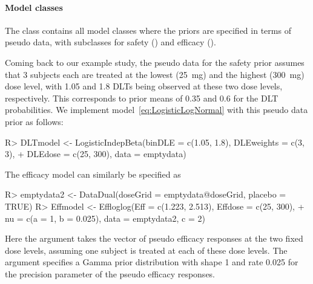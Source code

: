 \documentclass[article]{jss}\usepackage[]{graphicx}\usepackage[]{color}
\begin{document}
\paragraph{Model classes}
The  class contains all model classes where the priors are specified in terms of pseudo data, with subclasses for safety () and efficacy ().

Coming back to our example study, the pseudo data for the safety prior assumes that 3 subjects each are treated at the lowest (25~mg) and the highest (300~mg) dose level, with 1.05 and 1.8
DLTs being observed at these two dose levels, respectively. This corresponds to prior 
means of 0.35 and 0.6 for the DLT probabilities. We implement 
model~\eqref{eq:LogisticLogNormal} with this pseudo data prior as follows:
\begin{Schunk}
\begin{Sinput}
R> DLTmodel <- LogisticIndepBeta(binDLE = c(1.05, 1.8), DLEweights = c(3, 3),
+                                DLEdose = c(25, 300), data = emptydata)
\end{Sinput}
\end{Schunk}

The efficacy model can similarly be specified as
\begin{Schunk}
\begin{Sinput}
R> emptydata2 <- DataDual(doseGrid = emptydata@doseGrid, placebo = TRUE)
R> Effmodel <- Effloglog(Eff = c(1.223, 2.513), Effdose = c(25, 300), 
+                        nu = c(a = 1, b = 0.025), data = emptydata2, c = 2)
\end{Sinput}
\end{Schunk}
Here the argument  takes the vector of pseudo efficacy responses at the two fixed dose levels, assuming one subject is treated at each of these dose levels. The argument  specifies a Gamma prior distribution with shape 1 and rate 0.025 for the precision parameter of the pseudo efficacy responses.
\end{document}
